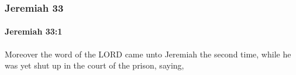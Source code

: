 	\subsubsection{Jeremiah 33} %
		\label{JEREMIAH-33}

		\paragraph{Jeremiah 33:1} %
			\label{JEREMIAH-33-1}

			Moreover the word of the LORD came unto Jeremiah the second time, while he was yet shut up in the court of the prison, saying,


